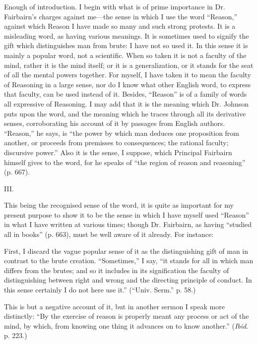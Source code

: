 Enough of introduction. I begin with what is of prime importance in
Dr. Fairbairn's charges against me—the sense in which I use the word
``Reason,'' against which Reason I have made so many and such
strong protests. It is a misleading word, as having various meanings.
It is sometimes used to signify the gift which distinguishes man from
brute: I have not so used it. In this sense it is mainly a popular
word, not a scientific. When so taken it is not a faculty of the mind,
rather it is the mind itself; or it is a generalization, or it stands
for the seat of all the mental powers together. For myself, I have
taken it to mean the faculty of Reasoning in a large sense, nor do I
know what other English word, to express that faculty, can be used
instead of it. Besides, ``Reason'' is of a family of words all
expressive of Reasoning. I may add that it is the meaning which Dr.
Johnson puts upon the word, and the meaning which he traces through
all its derivative senses, corroborating his account of it by passages
from English authors. ``Reason,'' he says, is ``the power
by which man deduces one proposition from another, or proceeds from
premisses to consequences; the rational faculty; discursive
power.'' Also it is the sense, I suppose, which Principal
Fairbairn himself gives to the word, for he speaks of ``the region
of reason and reasoning'' (p. 667).

III.

This being the recognised sense of the word, it is quite as
important for my present purpose to show it to be the sense in which I
have myself used ``Reason'' in what I have written at various
times; though Dr. Fairbairn, as having ``studied all in
books'' (p. 663), must be well aware of it already. For instance:

First, I discard the vague popular sense of it as the
distinguishing gift of man in contrast to the brute creation.
``Sometimes,'' I say, ``it stands for all in which man
differs from the brutes; and so it includes in its signification the
faculty of distinguishing between right and wrong and the directing
principle of conduct. In this sense certainly I do not here use
it.'' (``Univ. Serm.'' p. 58.)

This is but a negative account of it, but in another sermon I speak
more distinctly: ``By the exercise of reason is properly meant any
process or act of the mind, by which, from knowing one thing it
advances on to know another.'' (\emph{Ibid}. p. 223.)

